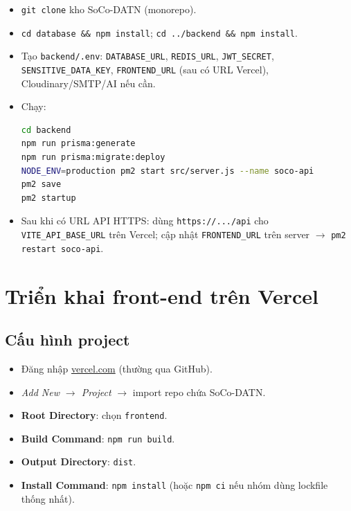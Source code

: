 \begin{itemize}
    \item \texttt{git clone} kho SoCo-DATN (monorepo).
    \item \texttt{cd database \&\& npm install}; \texttt{cd ../backend \&\& npm install}.
    \item Tạo \texttt{backend/.env}: \texttt{DATABASE\_URL}, \texttt{REDIS\_URL}, \texttt{JWT\_SECRET}, \texttt{SENSITIVE\_DATA\_KEY}, \texttt{FRONTEND\_URL} (sau có URL Vercel), Cloudinary/SMTP/AI nếu cần.
    \item Chạy:
\begin{lstlisting}[language=bash]
cd backend
npm run prisma:generate
npm run prisma:migrate:deploy
NODE_ENV=production pm2 start src/server.js --name soco-api
pm2 save
pm2 startup
\end{lstlisting}
    \item Sau khi có URL API HTTPS: dùng \texttt{https://.../api} cho \texttt{VITE\_API\_BASE\_URL} trên Vercel; cập nhật \texttt{FRONTEND\_URL} trên server $\rightarrow$ \texttt{pm2 restart soco-api}.
\end{itemize}

\section{Triển khai front-end trên Vercel}

\subsection{Cấu hình project}

\begin{itemize}
    \item Đăng nhập \href{https://vercel.com}{vercel.com} (thường qua GitHub).
    \item \textit{Add New $\rightarrow$ Project} $\rightarrow$ import repo chứa SoCo-DATN.
    \item \textbf{Root Directory}: chọn \texttt{frontend}.
    \item \textbf{Build Command}: \texttt{npm run build}.
    \item \textbf{Output Directory}: \texttt{dist}.
    \item \textbf{Install Command}: \texttt{npm install} (hoặc \texttt{npm ci} nếu nhóm dùng lockfile thống nhất).
\end{itemize}


